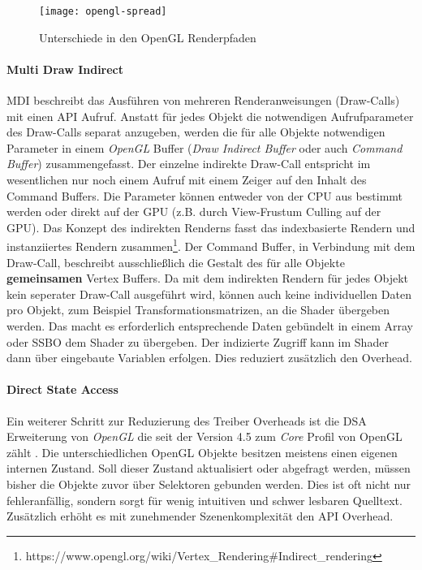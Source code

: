 \begin{figure}
	\texttt{[image: opengl-spread]}
	\caption[Unterschiede in den OpenGL Renderpfaden]{Unterschiede in den OpenGL Renderpfaden \parencite[Seite 98]{Everitt2014}}
	\label{fig:opengl-pfade}
\end{figure}

\paragraph{Multi Draw Indirect} 
\ac{MDI} beschreibt das Ausführen von mehreren Renderanweisungen (Draw-Calls) mit einen \ac{API} Aufruf. Anstatt für jedes Objekt die notwendigen Aufrufparameter des Draw-Calls separat anzugeben, werden die für alle Objekte notwendigen Parameter in einem \textit{OpenGL} Buffer (\textit{Draw Indirect Buffer} oder auch \textit{Command Buffer}) zusammengefasst. Der einzelne indirekte Draw-Call entspricht im wesentlichen nur noch einem Aufruf mit einem Zeiger auf den Inhalt des Command Buffers. Die Parameter können entweder von der CPU aus bestimmt werden oder direkt auf der GPU (z.B. durch View-Frustum Culling auf der GPU). Das Konzept des indirekten Renderns fasst das indexbasierte Rendern und instanziiertes Rendern zusammen\footnote{https://www.opengl.org/wiki/Vertex\_Rendering\#Indirect\_rendering}. Der Command Buffer, in Verbindung mit dem Draw-Call, beschreibt ausschließlich die Gestalt des für alle Objekte \textbf{gemeinsamen} Vertex Buffers. Da mit dem indirekten Rendern für jedes Objekt kein seperater Draw-Call ausgeführt wird, können auch keine individuellen Daten pro Objekt, zum Beispiel Transformationsmatrizen, an die Shader übergeben werden. Das macht es erforderlich entsprechende Daten gebündelt in einem Array oder \ac{SSBO} dem Shader zu übergeben. Der indizierte Zugriff kann im Shader dann über eingebaute Variablen erfolgen. Dies reduziert zusätzlich den Overhead.

\paragraph{Direct State Access} Ein weiterer Schritt zur Reduzierung des Treiber Overheads ist die \ac{DSA} Erweiterung von \textit{OpenGL} die seit der Version 4.5 zum \textit{Core} Profil von OpenGL zählt \parencite{Akeley2015}. Die unterschiedlichen OpenGL Objekte besitzen meistens einen eigenen internen Zustand. Soll dieser Zustand aktualisiert oder abgefragt werden, müssen bisher die Objekte zuvor über Selektoren gebunden werden. Dies ist oft nicht nur fehleranfällig, sondern sorgt für wenig intuitiven und schwer lesbaren Quelltext. Zusätzlich erhöht es mit zunehmender Szenenkomplexität den \ac{API} Overhead.


